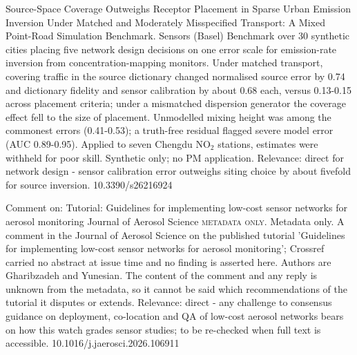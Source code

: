 \documentclass[10pt]{article}
\begin{document}
{Source-Space Coverage Outweighs Receptor Placement in Sparse Urban Emission Inversion Under Matched and Moderately Misspecified Transport: A Mixed Point-Road Simulation Benchmark.}
{Sensors (Basel)}
{Benchmark over 30 synthetic cities placing five network design decisions on one error scale for emission-rate inversion from concentration-mapping monitors. Under matched transport, covering traffic in the source dictionary changed normalised source error by 0.74 and dictionary fidelity and sensor calibration by about 0.68 each, versus 0.13-0.15 across placement criteria; under a mismatched dispersion generator the coverage effect fell to the size of placement. Unmodelled mixing height was among the commonest errors (0.41-0.53); a truth-free residual flagged severe model error (AUC 0.89-0.95). Applied to seven Chengdu NO$_2$ stations, estimates were withheld for poor skill. Synthetic only; no PM application. Relevance: direct for network design - sensor calibration error outweighs siting choice by about fivefold for source inversion.}
{10.3390/s26216924}

{Comment on: Tutorial: Guidelines for implementing low-cost sensor networks for aerosol monitoring}
{Journal of Aerosol Science}
{\textsc{metadata only.} Metadata only. A comment in the Journal of Aerosol Science on the published tutorial 'Guidelines for implementing low-cost sensor networks for aerosol monitoring'; Crossref carried no abstract at issue time and no finding is asserted here. Authors are Gharibzadeh and Yunesian. The content of the comment and any reply is unknown from the metadata, so it cannot be said which recommendations of the tutorial it disputes or extends. Relevance: direct - any challenge to consensus guidance on deployment, co-location and QA of low-cost aerosol networks bears on how this watch grades sensor studies; to be re-checked when full text is accessible.}
{10.1016/j.jaerosci.2026.106911}

\par{}\baselineskip{}\baselineskip
{}
\end{document}
